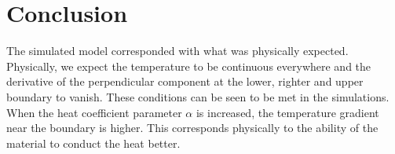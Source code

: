 \section{Conclusion}
The simulated model corresponded with what was physically expected. Physically, we expect the temperature to be continuous everywhere and the derivative of the perpendicular component at the lower, righter and upper boundary to vanish. These conditions can be seen to be met in the simulations. When the heat coefficient parameter $\alpha$ is increased, the temperature gradient near the boundary is higher. This corresponds physically to the ability of the material to conduct the heat better.